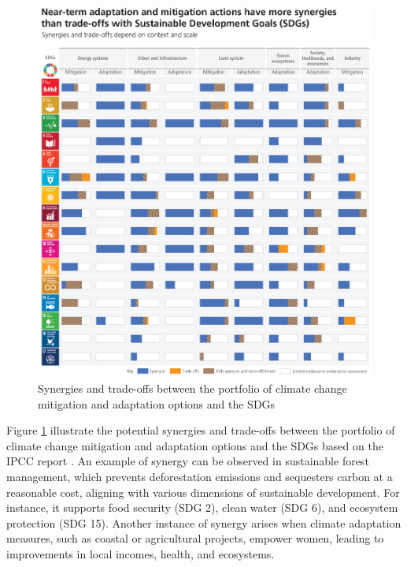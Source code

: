 \begin{figure}[p]
    \centering
    \includegraphics[width=\textwidth]{figs/chap2/IPCC_AR6_SYR_Figure_4_5.png}
    \caption[Synergies and trade-offs of climate action to other SDGs]{Synergies and trade-offs between the portfolio of climate change mitigation and adaptation options and the SDGs \citep{lee2023climate}}
    \label{fig:chap2_fig6}
\end{figure}
Figure \ref{fig:chap2_fig6} illustrate the potential synergies and trade-offs between the portfolio of climate change mitigation and adaptation options and the SDGs based on the IPCC report \citep{lee2023climate}. An example of synergy can be observed in sustainable forest management, which prevents deforestation emissions and sequesters carbon at a reasonable cost, aligning with various dimensions of sustainable development. For instance, it supports food security (SDG 2), clean water (SDG 6), and ecosystem protection (SDG 15). Another instance of synergy arises when climate adaptation measures, such as coastal or agricultural projects, empower women, leading to improvements in local incomes, health, and ecosystems. \par
